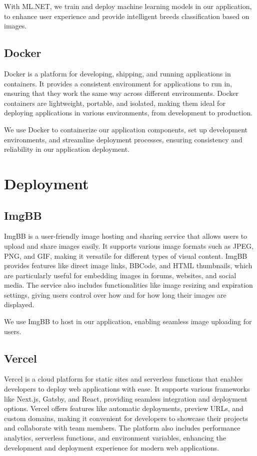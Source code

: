 With ML.NET, we train and deploy machine learning models in our application,
to enhance user experience and provide intelligent breeds classification
based on images.

\subsection{Docker}
Docker is a platform for developing, shipping, and running applications in containers.
It provides a consistent environment for applications to run in, ensuring that they
work the same way across different environments. Docker containers are lightweight,
portable, and isolated, making them ideal for deploying applications in various
environments, from development to production.

We use Docker to containerize our application components, set up development
environments, and streamline deployment processes, ensuring consistency and
reliability in our application deployment.

\section{Deployment}

\subsection{ImgBB}
ImgBB is a user-friendly image hosting and sharing service that allows users 
to upload and share images easily. It supports various image formats such as 
JPEG, PNG, and GIF, making it versatile for different types of visual content. 
ImgBB provides features like direct image links, BBCode, and HTML thumbnails, 
which are particularly useful for embedding images in forums, websites, and 
social media. The service also includes functionalities like image resizing and 
expiration settings, giving users control over how and for how long their images 
are displayed.

We use ImgBB to host in our application, enabling seamless
image uploading for users.

\subsection{Vercel}
Vercel is a cloud platform for static sites and serverless functions that enables
developers to deploy web applications with ease. It supports various frameworks
like Next.js, Gatsby, and React, providing seamless integration and deployment
options. Vercel offers features like automatic deployments, preview URLs, and
custom domains, making it convenient for developers to showcase their projects
and collaborate with team members. The platform also includes performance
analytics, serverless functions, and environment variables, enhancing the
development and deployment experience for modern web applications.

